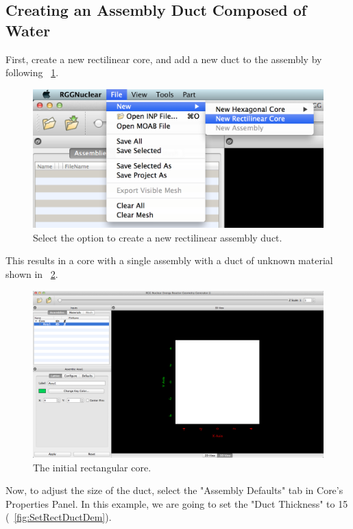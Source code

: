 \subsection{Creating an Assembly Duct Composed of Water}

First, create a new rectilinear core, and add a new duct to the assembly by following ~\ref{fig:Rect1}.

\begin{figure}[htb]
\begin{center}
\includegraphics[width=0.5\linewidth]{Images/rect-1e1.png}
\caption{Select the option to create a new rectilinear assembly duct.}
\label{fig:Rect1}
\end{center}
\end{figure}

This results in a core with a single assembly with a duct of unknown material shown in ~\ref{fig:NewRect}.

\begin{figure}[htb]
\begin{center}
\includegraphics[width=0.5\linewidth]{Images/rect-init-model.png}
\caption{The initial rectangular core.}
\label{fig:NewRect}
\end{center}
\end{figure}

Now, to adjust the size of the duct, select the "Assembly Defaults" tab in Core's Properties Panel.  In this example, we are going to set the "Duct Thickness" to 15 (~\ref{fig:SetRectDuctDem}).

